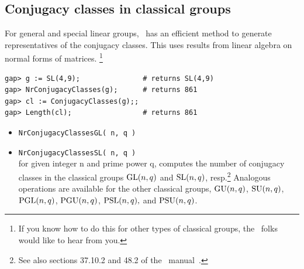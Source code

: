 \subsection{Conjugacy classes in classical groups}
For general and special linear groups, \gap\ has an efficient method to generate
representatives of the conjugacy classes. This uses results from linear algebra on normal forms of matrices.
\footnote{If you know how to do this for other types of classical groups, the \gap\
  folks would like to hear from you.}
{\codesize
\begin{verbatim}
gap> g := SL(4,9);               # returns SL(4,9)
gap> NrConjugacyClasses(g);      # returns 861
gap> cl := ConjugacyClasses(g);;
gap> Length(cl);                 # returns 861
\end{verbatim}}
  \begin{itemize}
\item {\tt NrConjugacyClassesGL( n, q )}
\item {\tt NrConjugacyClassesSL( n, q )}\\
for given integer n and prime power q, computes the number of conjugacy classes in
the classical groups $\operatorname{GL}(n, q)$ and $\operatorname{SL}(n, q)$, resp.\footnote{See also sections
  37.10.2 and 48.2 of the \gap\ manual~\cite{gapmanual}.}
Analogous operations are available for the other classical groups,
$\operatorname{GU}(n, q)$, $\operatorname{SU}(n, q)$, $\operatorname{PGL}(n, q)$, $\operatorname{PGU}(n, q)$, $\operatorname{PSL}(n, q),$ and $\operatorname{PSU}(n, q)$.
 \end{itemize}
\newpage

